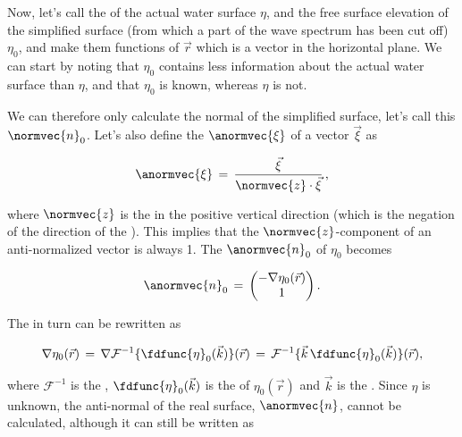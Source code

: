 {Now, let's call the  of the actual water surface $\eta$, and the free surface elevation of the simplified surface (from which a part of the wave spectrum has been cut off) $\eta_0$, and make them functions of $\vec{r}$ which is a \twodimensional vector in the horizontal plane. We can start by noting that $\eta_0$ contains less information about the actual water surface than $\eta$, and that $\eta_0$ is known, whereas $\eta$ is not.

We can therefore only calculate the normal of the simplified surface, let's call this $\normvec{n}_0$. Let's also define the  $\anormvec{\xi}$ of a vector $\vec{\xi}$ as

\begin{equation}
\anormvec{\xi} \,=\, \frac{\vec{\xi}}{\normvec{z}\cdot\vec{\xi}}\,,
\end{equation}

where $\normvec{z}$ is the  in the positive vertical direction (which is the negation of the direction of the ). This implies that the $\normvec{z}$-component of an anti-normalized vector is always 1. The  $\anormvec{n}_0$ of $\eta_0$ becomes

\begin{equation}
\anormvec{n}_0 \,=\, \left(\!\!\!\begin{array}{c}-\nabla\eta_0(\vec{r}) \\ 1\end{array}\!\!\!\right).
\end{equation}

The \gradient in turn can be rewritten as

\begin{equation}
\nabla\eta_0(\vec{r}) \,=\, \nabla\mathcal{F}^{-1}\{\fdfunc{\eta}_0(\vec{k})\}(\vec{r}) \,=\, \mathcal{F}^{-1}\{\vec{k}\,\fdfunc{\eta}_0(\vec{k})\}(\vec{r}),
\end{equation}

where $\mathcal{F}^{-1}$ is the , $\fdfunc{\eta}_0(\vec{k})$ is the  of $\eta_0(\vec{r})$ and $\vec{k}$ is the . Since $\eta$ is unknown, the anti-normal of the real surface, $\anormvec{n}$, cannot be calculated, although it can still be written as

}
